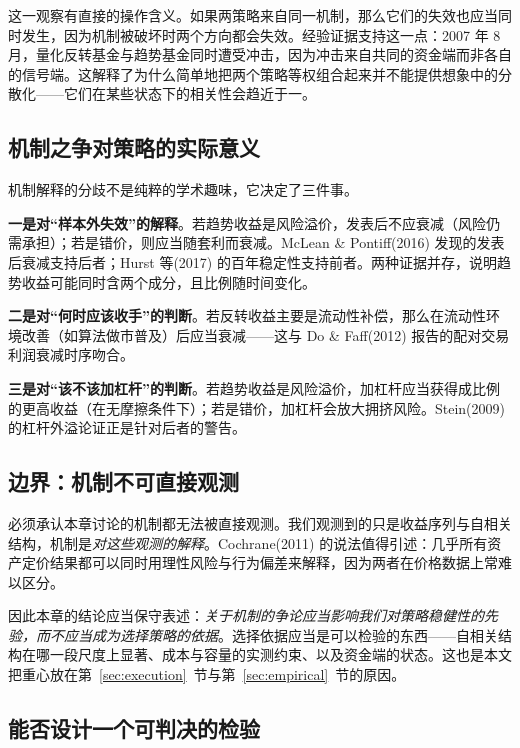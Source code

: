 这一观察有直接的操作含义。如果两策略来自同一机制，那么它们的失效也应当同时发生，因为机制被破坏时两个方向都会失效。经验证据支持这一点：2007 年 8 月，量化反转基金与趋势基金同时遭受冲击，因为冲击来自共同的资金端而非各自的信号端\cite{khandanilo2011,brunnermeier2009}。这解释了为什么简单地把两个策略等权组合起来并不能提供想象中的分散化——它们在某些状态下的相关性会趋近于一。

\subsection{机制之争对策略的实际意义}

机制解释的分歧不是纯粹的学术趣味，它决定了三件事。

\textbf{一是对“样本外失效”的解释}。若趋势收益是风险溢价，发表后不应衰减（风险仍需承担）；若是错价，则应当随套利而衰减。McLean \& Pontiff(2016) 发现的发表后衰减支持后者\cite{mcleanpontiff2016}；Hurst 等(2017) 的百年稳定性支持前者\cite{hop2017}。两种证据并存，说明趋势收益可能同时含两个成分，且比例随时间变化。

\textbf{二是对“何时应该收手”的判断}。若反转收益主要是流动性补偿，那么在流动性环境改善（如算法做市普及）后应当衰减——这与 Do \& Faff(2012) 报告的配对交易利润衰减时序吻合\cite{dofaff2012}。

\textbf{三是对“该不该加杠杆”的判断}。若趋势收益是风险溢价，加杠杆应当获得成比例的更高收益（在无摩擦条件下）；若是错价，加杠杆会放大拥挤风险。Stein(2009) 的杠杆外溢论证正是针对后者的警告\cite{stein2009}。

\subsection{边界：机制不可直接观测}

必须承认本章讨论的机制都无法被直接观测。我们观测到的只是收益序列与自相关结构，机制是\emph{对这些观测的解释}。Cochrane(2011) 的说法值得引述：几乎所有资产定价结果都可以同时用理性风险与行为偏差来解释，因为两者在价格数据上常难以区分\cite{cochrane2011}。

因此本章的结论应当保守表述：\emph{关于机制的争论应当影响我们对策略稳健性的先验，而不应当成为选择策略的依据}。选择依据应当是可以检验的东西——自相关结构在哪一段尺度上显著、成本与容量的实测约束、以及资金端的状态。这也是本文把重心放在第~\ref{sec:execution}~节与第~\ref{sec:empirical}~节的原因。

\subsection{能否设计一个可判决的检验}

